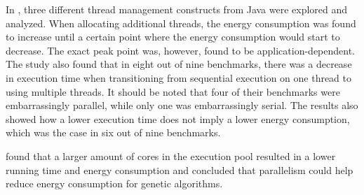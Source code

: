 
In \cite{Pinto2014}, three different thread management constructs from Java were explored and analyzed. When allocating additional threads, the energy consumption was found to increase until a certain point where the energy consumption would start to decrease. The exact peak point was, however, found to be application-dependent. The study also found that in eight out of nine benchmarks, there was a decrease in execution time when transitioning from sequential execution on one thread to using multiple threads. It should be noted that four of their benchmarks were embarrassingly parallel, while only one was embarrassingly serial. The results also showed how a lower execution time does not imply a lower energy consumption, which was the case in six out of nine benchmarks.\cite{Pinto2014}


\cite{abdelhafez2019} found that a larger amount of cores in the execution pool resulted in a lower running time and energy consumption and concluded that parallelism could help reduce energy consumption for genetic algorithms. %

